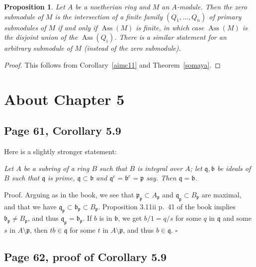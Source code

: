 \documentclass[parskip=half,fontsize=12pt]{scrartcl}%
\newcommand{\oo}{\operatorname}\newcommand{\ooo}{\operatorname*}
\newcommand{\mf}{\mathfrak}
\newcommand{\ppp}{\mf p}
\newcommand{\Ass}{\oo{Ass}}
\newtheorem{prop}[thm]{Proposition}
\begin{document}
\begin{prop}%
Let $A$ be a noetherian ring and $M$ an $A$-module. Then the zero submodule of $M$ is the intersection of a finite family $(Q_1,\dots,Q_n)$ of primary submodules  of $M$ if and only if $\Ass(M)$ is finite, in which case $\Ass(M)$ is the disjoint union of the $\Ass(Q_i)$. There is a similar statement for an arbitrary submodule of $M$ (instead of the zero submodule).%
\end{prop}
\begin{proof}
This follows from Corollary~\ref{aimc11} and Theorem~\ref{somaya}.
\end{proof}

\section{About Chapter 5}%

\subsection{Page 61, Corollary 5.9}\label{59}%

Here is a slightly stronger statement: 

\emph{Let $A$ be a subring of a ring $B$ such that $B$ is integral over $A$; let $\mf q,\mf b$ be ideals of $B$ such that $\mf q$ is prime, $\mf q\subset\mf b$ and $\mf q^{\oo c}=\mf b^{\oo c}=\ppp$ say. Then $\mf q=\mf b$.}

Proof. Arguing as in the book, we see that $\ppp_\ppp\subset A_\ppp$ and $\mf q_\ppp\subset B_\ppp$ are maximal, and that we have $\mf q_\ppp\subset\mf b_\ppp\subset B_\ppp$. Proposition 3.11ii p.~41 of the book implies $\mf b_\ppp\ne B_\ppp$, and thus $\mf q_\ppp=\mf b_\ppp$. If $b$ is in $\mf b$, we get $b/1=q/s$ for some $q$ in $\mf q$ and some $s$ in $A\setminus\ppp$, then $tb\in\mf q$ for some $t$ in $A\setminus\ppp$, and thus $b\in\mf q$. $\square$

\subsection{Page 62, proof of Corollary 5.9}%
\end{document}
